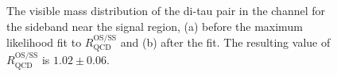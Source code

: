 \begin{figure}[h!]
\begin{center}
\end{center}
\caption[The visible mass distribution of the di-tau pair in
the \etau channel for the sideband near the signal region,
before and after the maximum likelihood fit to $R_{\text{QCD}}^{\text{OS/SS}}$.]{The visible mass distribution of the di-tau pair in the \etau channel for the sideband near the signal region, (a) before
the maximum likelihood fit to $R_{\text{QCD}}^{\text{OS/SS}}$ and (b) after the fit. The resulting value of $R_{\text{QCD}}^{\text{OS/SS}}$ is $1.02\pm0.06$.}
\label{fig:mssm_qcdosss_etnear}
\end{figure}

